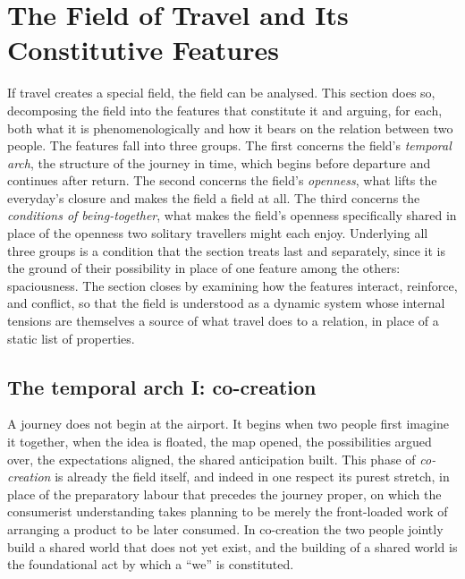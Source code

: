 \section{The Field of Travel and Its Constitutive Features}
\label{p21:sec:field}

\noindent
If travel creates a special field, the field can be analysed. This section does so, decomposing the field into the features that constitute it and arguing, for each, both what it is phenomenologically and how it bears on the relation between two people. The features fall into three groups. The first concerns the field's \emph{temporal arch}, the structure of the journey in time, which begins before departure and continues after return. The second concerns the field's \emph{openness}, what lifts the everyday's closure and makes the field a field at all. The third concerns the \emph{conditions of being-together}, what makes the field's openness specifically shared in place of the openness two solitary travellers might each enjoy. Underlying all three groups is a condition that the section treats last and separately, since it is the ground of their possibility in place of one feature among the others: spaciousness. The section closes by examining how the features interact, reinforce, and conflict, so that the field is understood as a dynamic system whose internal tensions are themselves a source of what travel does to a relation, in place of a static list of properties.

\subsection{The temporal arch I: co-creation}
\label{p21:sub:field-cocreation}

A journey does not begin at the airport. It begins when two people first imagine it together, when the idea is floated, the map opened, the possibilities argued over, the expectations aligned, the shared anticipation built. This phase of \emph{co-creation} is already the field itself, and indeed in one respect its purest stretch, in place of the preparatory labour that precedes the journey proper, on which the consumerist understanding takes planning to be merely the front-loaded work of arranging a product to be later consumed. In co-creation the two people jointly build a shared world that does not yet exist, and the building of a shared world is the foundational act by which a ``we'' is constituted.

